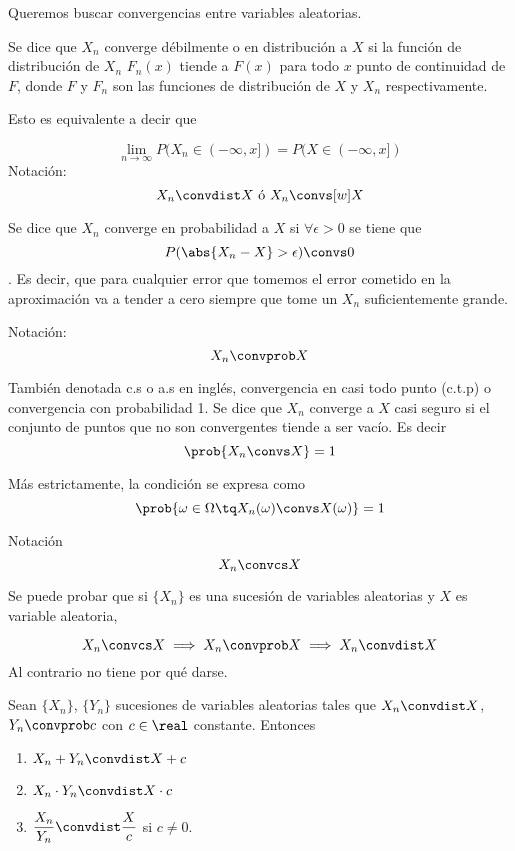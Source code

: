 \documentclass{apuntes}
\begin{document}
Queremos buscar convergencias entre variables aleatorias.

\begin{defn}

Se dice que $X_n$ converge débilmente o en distribución a $X$ si la función de distribución de $X_n$ $F_n(x)$ tiende a $F(x)$ para todo $x$ punto de continuidad de $F$, donde $F$ y $F_n$ son las funciones de distribución de $X$ y $X_n$ respectivamente.

Esto es equivalente a decir que  

\[\lim_{n\to\infty} P(X_n\in (-\infty, x]) = P(X\in (-\infty, x]) \]
Notación:
\[ X_n  \convdist X \text{ ó }  X_n \convs[w] X \] 
\end{defn}

\begin{defn} 
Se dice que $X_n$ converge en probabilidad a $X$ si $\forall \epsilon > 0$ se tiene que \[ P(\abs{X_n-X} > \epsilon) \convs 0 \]. Es decir, que para cualquier error que tomemos el error cometido en la aproximación va a tender a cero siempre que tome un $X_n$ suficientemente grande.

Notación: \[ X_n \convprob X \]
\end{defn}

\begin{defn} También denotada c.s o a.s en inglés, convergencia en casi todo punto (c.t.p) o convergencia con probabilidad 1. Se dice que $X_n$ converge a $X$ casi seguro si el conjunto de puntos que no son convergentes tiende a ser vacío. Es decir \[ \prob{X_n \convs X} = 1\]

Más estrictamente, la condición se expresa como \[\prob{\omega \in \Omega\tq X_n(\omega) \convs X(\omega)} = 1\]

Notación \[ X_n\convcs X \]
\end{defn}


\begin{theorem}Se puede probar que si $\{X_n\}$ es una sucesión de variables aleatorias y $X$ es variable aleatoria, 

\[ X_n\convcs X \implies X_n \convprob X \implies X_n \convdist X \]
Al contrario no tiene por qué darse.
\end{theorem}


\begin{theorem}\label{thmSlutsky} Sean $\{X_n\}$, $\{Y_n\}$ sucesiones de variables aleatorias tales que $X_n\convdist X$, $Y_n\convprob c$ con $c\in\real$ constante. Entonces

\begin{enumerate}
\item $X_n + Y_n \convdist X + c$
\item $X_n \cdot Y_n \convdist X \cdot c$
\item $\dfrac{X_n}{Y_n}\convdist \dfrac{X}{c}$ si $c≠0$.
\end{enumerate}
\end{theorem}
\end{document}
